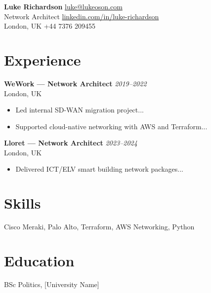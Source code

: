 \documentclass[10pt]{article}
\begin{document}
\noindent\textbf{Luke Richardson} \hfill \href{mailto:luke@lukeoson.com}{luke@lukeoson.com} \\
Network Architect \hfill \href{https://linkedin.com/in/luke-richardson}{linkedin.com/in/luke-richardson} \\
London, UK \hfill +44 7376 209455 \\

\vspace{1em}

\section*{Experience}

\textbf{WeWork — Network Architect} \hfill \textit{2019–2022} \\
London, UK \\
\begin{itemize}
  \item Led internal SD-WAN migration project...
  \item Supported cloud-native networking with AWS and Terraform...
\end{itemize}

\textbf{Lloret — Network Architect} \hfill \textit{2023–2024} \\
London, UK \\
\begin{itemize}
  \item Delivered ICT/ELV smart building network packages...
\end{itemize}

\section*{Skills}
Cisco Meraki, Palo Alto, Terraform, AWS Networking, Python

\section*{Education}
BSc Politics, [University Name]
\end{document}
